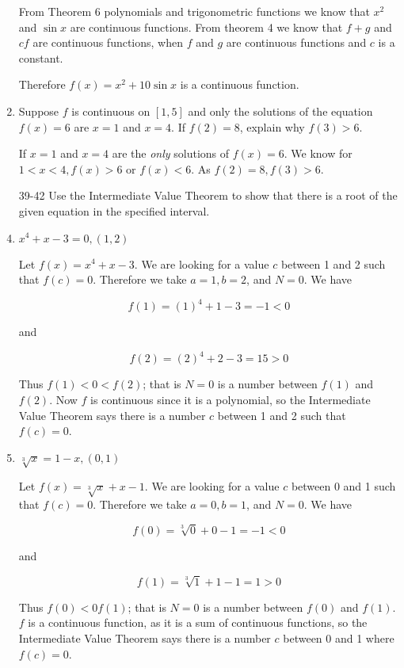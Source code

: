 \documentclass{article}
\begin{document}
\begin{enumerate}
			From Theorem 6 polynomials and trigonometric functions we know that $x^2$
			and $\sin x$ are continuous functions. From theorem 4 we know that 
			$f + g$ and $cf$ are continuous functions, when $f$ and $g$ are continuous
			functions and $c$ is a constant.

			Therefore $f(x) = x^2 + 10\sin x$ is a continuous function.	

			\item Suppose $f$ is continuous on $[1,5]$ and only the solutions of the equation
				$f(x) = 6$ are $x = 1$ and $x = 4$. If $f(2) = 8$, explain why $f(3) > 6$.

				If $x = 1$ and $x = 4$ are the \emph{only} solutions of $f(x) = 6$. We know for 
				$1 < x < 4, f(x) > 6 \text{ or } f(x) < 6$. As $f(2) = 8, f(3) > 6$.

			\item[39-42] Use the Intermediate Value Theorem to show that there is a root of the
				given equation in the specified interval.

			\item $x^4 + x - 3 = 0, (1,2)$

				Let $f(x) = x^4 + x - 3$. We are looking for a value $c$ between 1 and 2
				such that $f(c) = 0$. Therefore we take $a = 1, b = 2$, and $N = 0$. We
				have

				$$f(1) = (1)^4 + 1 - 3 = -1 < 0$$

				and

				$$f(2) = (2)^4 + 2 - 3 = 15 > 0$$

				Thus $f(1) < 0 < f(2)$; that is $N = 0$ is a number between $f(1)$ and
				$f(2)$. Now $f$ is continuous since it is a polynomial, so the Intermediate
				Value Theorem says there is a number $c$ between 1 and 2 such that
				$f(c) = 0$.

			\item $\sqrt[3]{x} = 1 - x, (0, 1)$

				Let $f(x) = \sqrt[3]{x} + x - 1$. We are looking for a value $c$ between
				0 and 1 such that $f(c) = 0$. Therefore we take $a = 0, b = 1$, and $N = 0$.
				We have

				$$f(0) = \sqrt[3]{0} + 0 - 1 = -1 < 0$$

				and

				$$f(1) = \sqrt[3]{1} + 1 - 1 = 1 > 0$$

				Thus $f(0) < 0 f(1)$; that is $N = 0$ is a number between $f(0)$ and $f(1)$.
				$f$ is a continuous function, as it is a sum of continuous functions, so the
				Intermediate Value Theorem says there is a number $c$ between 0 and 1 where
				$f(c) = 0$.
	\end{enumerate}
\end{document}
